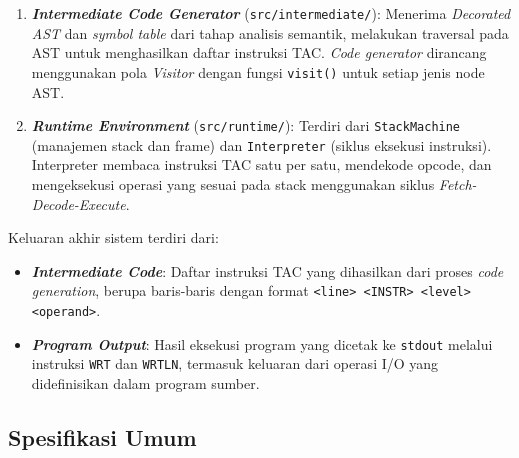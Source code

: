 \documentclass[12pt,a4paper]{article}
\begin{document}
\begin{enumerate}
    \item \textbf{\textit{Intermediate Code Generator}} (\texttt{src/intermediate/}):
        Menerima \textit{Decorated AST} dan \textit{symbol table} dari tahap
        analisis semantik, melakukan traversal pada AST untuk menghasilkan
daftar instruksi TAC. \textit{Code generator} dirancang menggunakan pola
\textit{Visitor} dengan fungsi \texttt{visit()} untuk setiap jenis node AST.

    \item \textbf{\textit{Runtime Environment}} (\texttt{src/runtime/}):
        Terdiri dari \texttt{StackMachine} (manajemen stack dan frame) dan
        \texttt{Interpreter} (siklus eksekusi instruksi). Interpreter membaca
        instruksi TAC satu per satu, mendekode opcode, dan mengeksekusi operasi
yang sesuai pada stack menggunakan siklus \textit{Fetch-Decode-Execute}.
\end{enumerate}

Keluaran akhir sistem terdiri dari:
\begin{itemize}
    \item \textbf{\textit{Intermediate Code}}: Daftar instruksi TAC yang
        dihasilkan dari proses \textit{code generation}, berupa baris-baris
        dengan format \texttt{<line> <INSTR> <level> <operand>}.
    \item \textbf{\textit{Program Output}}: Hasil eksekusi program yang
        dicetak ke \texttt{stdout} melalui instruksi \texttt{WRT} dan
        \texttt{WRTLN}, termasuk keluaran dari operasi I/O yang didefinisikan
        dalam program sumber.
\end{itemize}

\subsection{Spesifikasi Umum}
\end{document}
